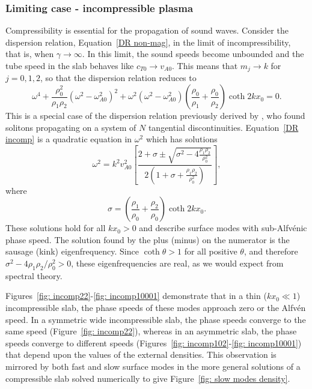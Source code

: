 \documentclass[12pt,draft]{../style-files/ociamthesis}
\begin{document}
\subsubsection{Limiting case - incompressible plasma} \label{sec: incomp}

Compressibility is essential for the propagation of sound waves. Consider the dispersion relation, Equation~\eqref{DR non-mag}, in the limit of incompressibility, that is, when $\gamma \to \infty$. In this limit, the sound speeds become unbounded and the tube speed in the slab behaves like $c_{T0} \to {v_{A0}}$. This means that $m_j \to {k}$ for $j = 0, 1, 2$, so that the dispersion relation reduces to
\begin{equation}
\omega^4 + \frac{\rho_0^2}{\rho_1\rho_2}(\omega^2 - \omega_{A0}^2)^2 + \omega^2(\omega^2 - \omega_{A0}^2)\left(\frac{\rho_0}{\rho_1} + \frac{\rho_0}{\rho_2}\right) \coth{2kx_0} = 0. \label{DR incomp}
\end{equation}
This is a special case of the dispersion relation previously derived by \cite{rud92}, who found solitons propagating on a system of $N$ tangential discontinuities. Equation~\eqref{DR incomp} is a quadratic equation in $\omega^2$ which has solutions
\begin{equation}
\omega^2 = k^2v_{A0}^2\left[\frac{2 + \sigma \pm \sqrt{\sigma^2 - 4\frac{\rho_1\rho_2}{\rho_0^2}}}{2\left(1 + \sigma + \frac{\rho_1\rho_2}{\rho_0^2}\right)}\right],
\end{equation}
where
\begin{equation}
\sigma = \left(\frac{\rho_1}{\rho_0} + \frac{\rho_2}{\rho_0}\right)\coth{2kx_0}.
\end{equation}
These solutions hold for all $kx_0 > 0$ and describe surface modes with sub-Alfv\'enic phase speed. The solution found by the plus (minus) on the numerator is the sausage (kink) eigenfrequency. Since $\coth{\theta} > 1$ for all positive $\theta$, and therefore $\sigma^2 - 4\rho_1\rho_2/\rho_0^2 > 0$, these eigenfrequencies are real, as we would expect from spectral theory.

Figures~\ref{fig: incomp22}-\ref{fig: incomp10001} demonstrate that in a thin ($kx_0 \ll 1$) incompressible slab, the phase speeds of these modes approach zero or the Alfv\'{e}n speed. In a symmetric wide incompressible slab, the phase speeds converge to the same speed (Figure~\ref{fig: incomp22}), whereas in an asymmetric slab, the phase speeds converge to different speeds (Figures~\ref{fig: incomp102}-\ref{fig: incomp10001}) that depend upon the values of the external densities. This observation is mirrored by both fast and slow surface modes in the more general solutions of a compressible slab solved numerically to give Figure~\ref{fig: slow modes density}.
\end{document}
